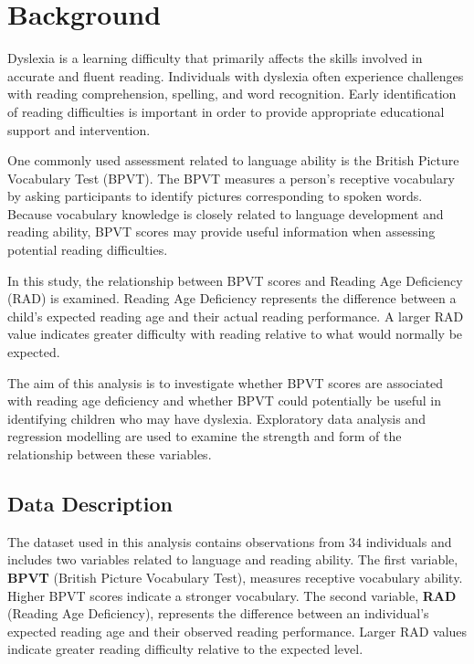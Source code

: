 \documentclass[11pt, a4paper]{article}
\begin{document}
\vskip 6.5pt


\section{Background} \label{sec:background}

Dyslexia is a learning difficulty that primarily affects the skills involved in accurate and fluent reading. Individuals with dyslexia often experience challenges with reading comprehension, spelling, and word recognition. Early identification of reading difficulties is important in order to provide appropriate educational support and intervention.

One commonly used assessment related to language ability is the British Picture Vocabulary Test (BPVT). The BPVT measures a person's receptive vocabulary by asking participants to identify pictures corresponding to spoken words. Because vocabulary knowledge is closely related to language development and reading ability, BPVT scores may provide useful information when assessing potential reading difficulties.

In this study, the relationship between BPVT scores and Reading Age Deficiency (RAD) is examined. Reading Age Deficiency represents the difference between a child's expected reading age and their actual reading performance. A larger RAD value indicates greater difficulty with reading relative to what would normally be expected.

The aim of this analysis is to investigate whether BPVT scores are associated with reading age deficiency and whether BPVT could potentially be useful in identifying children who may have dyslexia. Exploratory data analysis and regression modelling are used to examine the strength and form of the relationship between these variables.

\subsection*{Data Description}

The dataset used in this analysis contains observations from 34 individuals and includes two variables related to language and reading ability. The first variable, \textbf{BPVT} (British Picture Vocabulary Test), measures receptive vocabulary ability. Higher BPVT scores indicate a stronger vocabulary. The second variable, \textbf{RAD} (Reading Age Deficiency), represents the difference between an individual's expected reading age and their observed reading performance. Larger RAD values indicate greater reading difficulty relative to the expected level.
\end{document}
